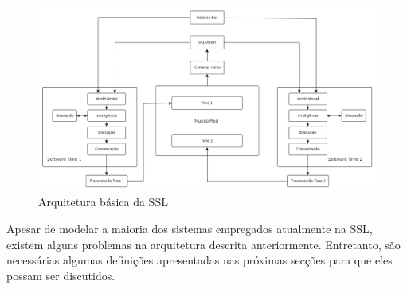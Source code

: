 \begin{landscape}
  \begin{figure}[thpb]
    \centering
    \includegraphics[width=20cm]{imgs/arquitetura_ssl}
    \caption{Arquitetura básica da SSL}
    \label{arquitetura_ssl}
  \end{figure}
\end{landscape}

Apesar de modelar a maioria dos sistemas empregados atualmente na
SSL, existem alguns problemas na arquitetura descrita anteriormente. Entretanto,
são necessárias algumas definições apresentadas nas próximas secções para que eles possam ser discutidos.

